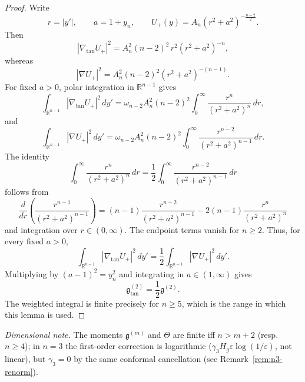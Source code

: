 \documentclass[11pt,reqno,a4paper]{amsart}
\newcommand{\R}{\mathbb{R}}
\numberwithin{equation}{section}
\theoremstyle{plain}
\theoremstyle{remark}
\theoremstyle{plain}
\begin{document}
\begin{proof}
Write
\[
r=|y'|,
\qquad
a=1+y_n,
\qquad
U_+(y)=A_n(r^2+a^2)^{-\frac{n-2}{2}}.
\]
Then
\[
|\nabla_{\tan}U_+|^2
=
A_n^2(n-2)^2\,r^2(r^2+a^2)^{-n},
\]
whereas
\[
|\nabla U_+|^2
=
A_n^2(n-2)^2(r^2+a^2)^{-(n-1)}.
\]
For fixed $a>0$, polar integration in $\R^{n-1}$ gives
\[
\int_{\R^{n-1}}|\nabla_{\tan}U_+|^2\,dy'
=
\omega_{n-2}A_n^2(n-2)^2
\int_0^\infty
\frac{r^n}{(r^2+a^2)^n}\,dr,
\]
and
\[
\int_{\R^{n-1}}|\nabla U_+|^2\,dy'
=
\omega_{n-2}A_n^2(n-2)^2
\int_0^\infty
\frac{r^{n-2}}{(r^2+a^2)^{n-1}}\,dr.
\]
The identity
\[
\int_0^\infty
\frac{r^n}{(r^2+a^2)^n}\,dr
=
\frac12
\int_0^\infty
\frac{r^{n-2}}{(r^2+a^2)^{n-1}}\,dr
\]
follows from
\[
\frac{d}{dr}
\left(
\frac{r^{n-1}}{(r^2+a^2)^{n-1}}
\right)
=
(n-1)\frac{r^{n-2}}{(r^2+a^2)^{n-1}}
-
2(n-1)\frac{r^n}{(r^2+a^2)^n}
\]
and integration over $r\in(0,\infty)$.  The endpoint terms vanish for $n\ge2$.
Thus, for every fixed $a>0$,
\[
\int_{\R^{n-1}}|\nabla_{\tan}U_+|^2\,dy'
=
\frac12
\int_{\R^{n-1}}|\nabla U_+|^2\,dy'.
\]
Multiplying by $(a-1)^2=y_n^2$ and integrating in $a\in(1,\infty)$ gives
\[
\mathfrak g^{(2)}_{\tan}=\frac12\mathfrak g^{(2)}.
\]
The weighted integral is finite precisely for $n\ge5$, which is the range in
which this lemma is used.
\end{proof}

\noindent\emph{Dimensional note.} The moments $\mathfrak g^{(m)}$ and $\Theta$ are finite iff $n>m+2$ (resp.\ $n\ge4$); in $n=3$ the first-order correction is logarithmic ($\gamma_3H_g\varepsilon\log(1/\varepsilon)$, not linear), but $\gamma_3=0$ by the same conformal cancellation (see Remark~\ref{rem:n3-renorm}).
\end{document}
